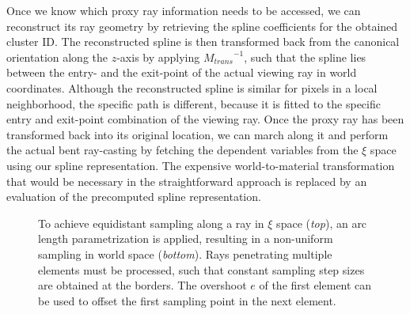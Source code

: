 \documentclass[journal]{vgtc}                %
\begin{document}
Once we know which proxy ray information needs to be accessed, we can reconstruct its ray geometry by retrieving the spline coefficients for the obtained cluster ID. The reconstructed spline is then transformed back from the canonical orientation along the $z$-axis by applying ${M_{trans}}^{-1}$, such that the spline lies between the entry- and the exit-point of the actual viewing ray in world coordinates. Although the reconstructed spline is similar for pixels in a local neighborhood, the specific path is different, because it is fitted to the specific entry and exit-point combination of the viewing ray. Once the proxy ray has been transformed back into its original location, we can march along it and perform the actual bent ray-casting by fetching the dependent variables from the $\xi$ space using our spline representation. The expensive world-to-material transformation that would be necessary in the straightforward approach is replaced by an evaluation of the precomputed spline representation. 
%
\begin{figure}[b]
    \centering
    \hspace*{1cm}
    \caption{ To achieve equidistant sampling along a ray in $\xi$ space ({\it top}), an arc length parametrization is applied, resulting in a non-uniform sampling in world space ({\it bottom}).  Rays penetrating multiple elements must be processed, such that constant sampling step sizes are obtained at the borders. The overshoot $e$ of the first element can be used to offset the first sampling point in the next element.}
    \label{fig:arclengthandovershoot}
\end{figure}
\end{document}
